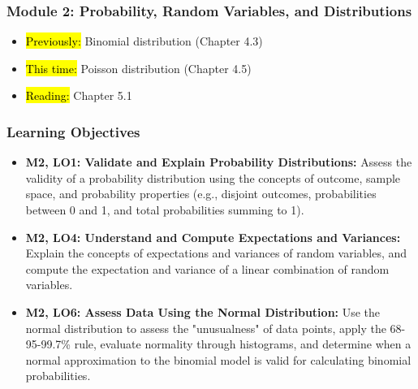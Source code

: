 
\begin{frame}
    \frametitle{Module 2: Probability, Random Variables, and Distributions}
    \begin{itemize}
        \item \hl{Previously: }Binomial distribution (Chapter 4.3)
        \item \hl{This time: }Poisson distribution (Chapter 4.5)
        \item \hl{Reading: }Chapter 5.1
    \end{itemize}

\end{frame}
\begin{frame}
    \frametitle{Learning Objectives}
    \begin{itemize}
        \item \textbf{M2, LO1: Validate and Explain Probability Distributions:} Assess the validity of a probability distribution using the concepts of outcome, sample space, and probability properties (e.g., disjoint outcomes, probabilities between 0 and 1, and total probabilities summing to 1).
        \item \textbf{M2, LO4: Understand and Compute Expectations and Variances:} Explain the concepts of expectations and variances of random variables, and compute the expectation and variance of a linear combination of random variables.
        \item \textbf{M2, LO6: Assess Data Using the Normal Distribution:} Use the normal distribution to assess the "unusualness" of data points, apply the 68-95-99.7\% rule, evaluate normality through histograms, and determine when a normal approximation to the binomial model is valid for calculating binomial probabilities.
    \end{itemize}
\end{frame}

